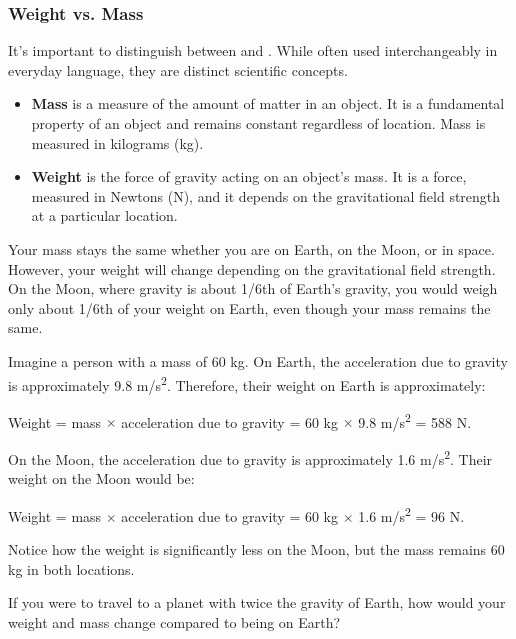 \subsubsection{Weight vs. Mass}

It's important to distinguish between  and .  While often used interchangeably in everyday language, they are distinct scientific concepts.

\begin{itemize}
    \item \textbf{Mass} is a measure of the amount of matter in an object.  It is a fundamental property of an object and remains constant regardless of location. Mass is measured in kilograms (kg).
    \item \textbf{Weight} is the force of gravity acting on an object's mass.  It is a force, measured in Newtons (N), and it depends on the gravitational field strength at a particular location.
\end{itemize}

Your mass stays the same whether you are on Earth, on the Moon, or in space. However, your weight will change depending on the gravitational field strength.  On the Moon, where gravity is about 1/6th of Earth's gravity, you would weigh only about 1/6th of your weight on Earth, even though your mass remains the same.

\begin{example}
Imagine a person with a mass of 60 kg. On Earth, the acceleration due to gravity is approximately 9.8 m/s\textsuperscript{2}.  Therefore, their weight on Earth is approximately:

Weight = mass $\times$ acceleration due to gravity = 60 kg $\times$ 9.8 m/s\textsuperscript{2} = 588 N.

On the Moon, the acceleration due to gravity is approximately 1.6 m/s\textsuperscript{2}.  Their weight on the Moon would be:

Weight = mass $\times$ acceleration due to gravity = 60 kg $\times$ 1.6 m/s\textsuperscript{2} = 96 N.

Notice how the weight is significantly less on the Moon, but the mass remains 60 kg in both locations.
\end{example}

\begin{stopandthink}
If you were to travel to a planet with twice the gravity of Earth, how would your weight and mass change compared to being on Earth?
\end{stopandthink}

